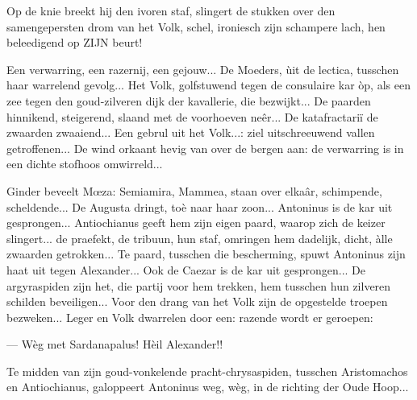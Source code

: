 \documentclass[a4paper, 12pt, oneside, dutch]{article}
\begin{document}
Op de knie breekt hij den ivoren staf, slingert de stukken over den samengepersten drom van het Volk, schel, ironiesch zijn schampere lach, hen beleedigend op ZIJN beurt!

Een verwarring, een razernij, een gejouw... De Moeders, ùit de lectica, tusschen haar warrelend gevolg... Het Volk, golfstuwend tegen de consulaire kar òp, als een zee tegen den goud-zilveren dijk der kavallerie, die bezwijkt... De paarden hinnikend, steigerend, slaand met de voorhoeven neêr... De katafractariï de zwaarden zwaaiend... Een gebrul uit het Volk...: ziel uitschreeuwend vallen getroffenen... De wind orkaant hevig van over de bergen aan: de verwarring is in een dichte stofhoos omwirreld...

Ginder beveelt Mœza: Semiamira, Mammea, staan over elkaâr, schimpende, scheldende... De Augusta dringt, toè naar haar zoon... Antoninus is de kar uit gesprongen... Antiochianus geeft hem zijn eigen paard, waarop zich de keizer slingert... de praefekt, de tribuun, hun staf, omringen hem dadelijk, dicht, àlle zwaarden getrokken... Te paard, tusschen die bescherming, spuwt Antoninus zijn haat uit tegen Alexander... Ook de Caezar is de kar uit gesprongen... De argyraspiden zijn het, die partij voor hem trekken, hem tusschen hun zilveren schilden beveiligen... Voor den drang van het Volk zijn de opgestelde troepen bezweken... Leger en Volk dwarrelen door een: razende wordt er geroepen:

--- Wèg met Sardanapalus! Hèil Alexander!!

Te midden van zijn goud-vonkelende pracht-chrysaspiden, tusschen Aristomachos en Antiochianus, galoppeert Antoninus weg, wèg, in de richting der Oude Hoop...

\subsection{}
\end{document}
